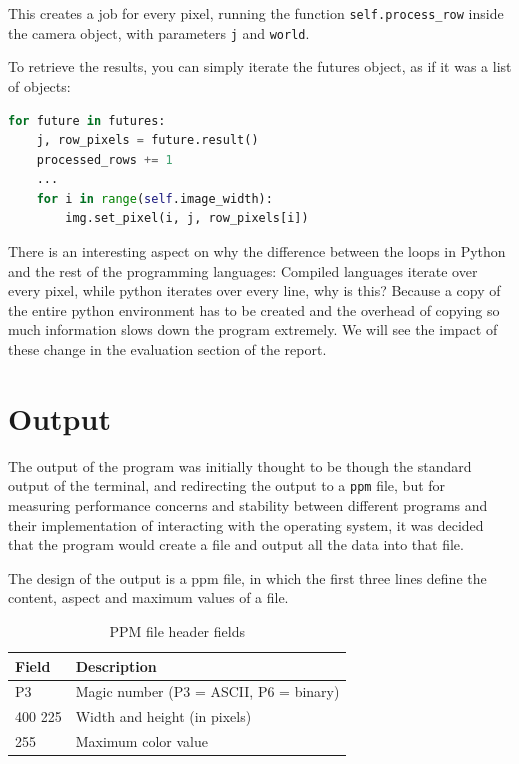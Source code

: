 This creates a job for every pixel, running the function \texttt{self.process\_row} inside the camera object, with parameters \texttt{j} and \texttt{world}.

To retrieve the results, you can simply iterate the futures object, as if it was a list of objects:
\begin{lstlisting}[language=Python, caption={Python retieving data from Process execution pool.}, label={lst:python_executor_retrieve}]
for future in futures:
    j, row_pixels = future.result()
    processed_rows += 1
    ...
    for i in range(self.image_width):
        img.set_pixel(i, j, row_pixels[i])
\end{lstlisting}


There is an interesting aspect on why the difference between the loops in Python and the rest of the programming languages: Compiled languages iterate over every pixel, while python iterates over every line, why is this? Because a copy of the entire python environment has to be created and the overhead of copying so much information slows down the program extremely. We will see the impact of these change in the evaluation section of the report.

\section{Output}
\label{sec:output}
The output of the program was initially thought to be though the standard output of the terminal, and redirecting the output to a \texttt{\gls{ppm}} file, but for measuring performance concerns and stability between different programs and their implementation of interacting with the operating system, it was decided that the program would create a file and output all the data into that file.

The design of the output is a \gls{ppm} file, in which the first three lines define the content, aspect and maximum values of a file. 
\begin{table}[H]
  \begin{tabular}{@{}ll@{}}
    \toprule
    Field        & Description                                 \\
    \midrule
    P3           & Magic number (P3 = ASCII, P6 = binary)      \\
    400 225      & Width and height (in pixels)                \\
    255          & Maximum color value                         \\
    \bottomrule
  \end{tabular}
  \caption{PPM file header fields}
  \label{tab:ppm-header}
\end{table}

